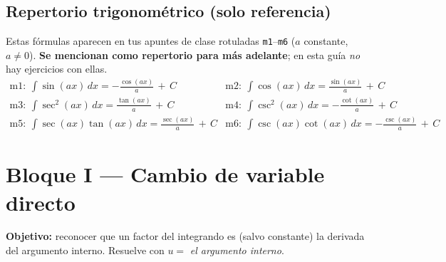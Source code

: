 \documentclass[12pt, letterpaper]{article}
\newcommand{\dx}{\,dx}
\newcommand{\CC}{\,+\,C}
\begin{document}
\newpage
\subsection{Repertorio trigonométrico (solo referencia)}

\begin{cuadroextra}
\small
Estas fórmulas aparecen en tus apuntes de clase rotuladas \texttt{m1}--\texttt{m6}
($a$ constante, $a \neq 0$). \textbf{Se mencionan como repertorio para más adelante};
en esta guía \emph{no} hay ejercicios con ellas.
\[
\begin{array}{ll}
\text{m1}:\ \displaystyle\int \sin(ax)\dx = -\frac{\cos(ax)}{a} \CC &
\text{m2}:\ \displaystyle\int \cos(ax)\dx = \frac{\sin(ax)}{a} \CC \\[10pt]
\text{m3}:\ \displaystyle\int \sec^{2}(ax)\dx = \frac{\tan(ax)}{a} \CC &
\text{m4}:\ \displaystyle\int \csc^{2}(ax)\dx = -\frac{\cot(ax)}{a} \CC \\[10pt]
\text{m5}:\ \displaystyle\int \sec(ax)\tan(ax)\dx = \frac{\sec(ax)}{a} \CC &
\text{m6}:\ \displaystyle\int \csc(ax)\cot(ax)\dx = -\frac{\csc(ax)}{a} \CC
\end{array}
\]
\end{cuadroextra}

\newpage
\section{Bloque I — Cambio de variable directo}

\begin{cuadroinfo}
\small
\textbf{Objetivo:} reconocer que un factor del integrando es (salvo constante) la
derivada del argumento interno. Resuelve con $u = $ \emph{el argumento interno}.
\end{cuadroinfo}

\vspace{4pt}
\end{document}
